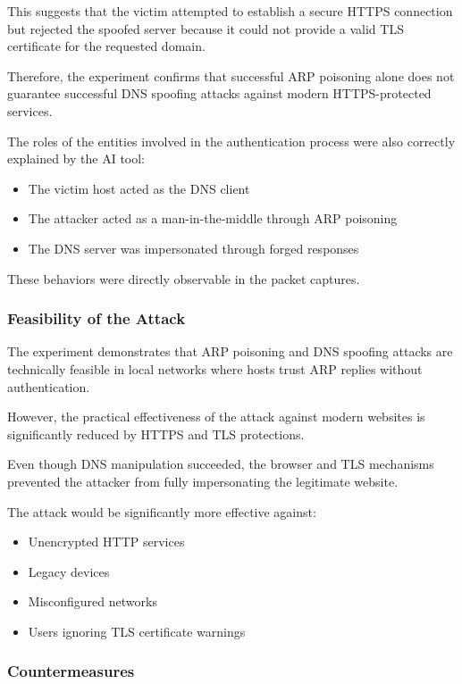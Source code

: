 \documentclass[12pt]{article}
\begin{document}
This suggests that the victim attempted to establish
a secure HTTPS connection but rejected the spoofed server
because it could not provide a valid TLS certificate
for the requested domain.

Therefore, the experiment confirms that successful ARP poisoning
alone does not guarantee successful DNS spoofing attacks
against modern HTTPS-protected services.

The roles of the entities involved in the authentication process
were also correctly explained by the AI tool:

\begin{itemize}
\item The victim host acted as the DNS client
\item The attacker acted as a man-in-the-middle
through ARP poisoning
\item The DNS server was impersonated through forged responses
\end{itemize}

These behaviors were directly observable in the packet captures.

\subsubsection{Feasibility of the Attack}

The experiment demonstrates that ARP poisoning
and DNS spoofing attacks are technically feasible
in local networks where hosts trust ARP replies
without authentication.

However, the practical effectiveness of the attack
against modern websites is significantly reduced
by HTTPS and TLS protections.

Even though DNS manipulation succeeded,
the browser and TLS mechanisms prevented
the attacker from fully impersonating
the legitimate website.

The attack would be significantly more effective
against:

\begin{itemize}
\item Unencrypted HTTP services
\item Legacy devices
\item Misconfigured networks
\item Users ignoring TLS certificate warnings
\end{itemize}

\subsubsection{Countermeasures}
\end{document}
